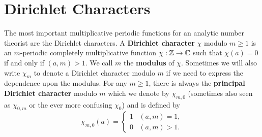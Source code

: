   \section{Dirichlet Characters}
    The most important multiplicative periodic functions for an analytic number theorist are the Dirichlet characters. A \textbf{Dirichlet character} $\chi$ modulo $m \ge 1$ is an $m$-periodic completely multiplicative function $\chi:\mathbb{Z} \to \mathbb{C}$ such that $\chi(a) = 0$ if and only if $(a,m) > 1$. We call $m$ the \textbf{modulus} of $\chi$. Sometimes we will also write $\chi_{m}$ to denote a Dirichlet character modulo $m$ if we need to express the dependence upon the modulus. For any $m \ge 1$, there is always the \textbf{principal Dirichlet character} modulo $m$ which we denote by $\chi_{m,0}$ (sometimes also seen as $\chi_{0,m}$ or the ever more confusing $\chi_{0}$) and is defined by
    \[
      \chi_{m,0}(a) = \begin{cases} 1 & (a,m) = 1, \\ 0 & (a,m) > 1. \end{cases}
    \]
